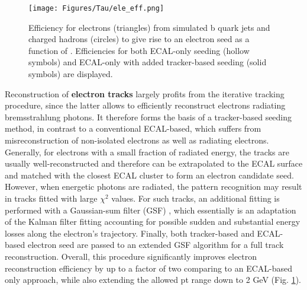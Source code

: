 

\begin{figure}[ht!]
    \centering
    \texttt{[image: Figures/Tau/ele\_eff.png]}
    \caption{Efficiency for electrons (triangles) from simulated b quark jets and charged hadrons (circles) to give rise to an electron seed as a function of \pt. Efficiencies for both ECAL-only seeding (hollow symbols) and ECAL-only with added tracker-based seeding (solid symbols) are displayed.}
    \label{fig:ele_eff}
\end{figure}

Reconstruction of \textbf{electron tracks} largely profits from the iterative tracking procedure, since the latter allows to efficiently reconstruct electrons radiating bremsstrahlung photons. It therefore forms the basis of a tracker-based seeding method, in contrast to a conventional ECAL-based, which suffers from misreconstruction of non-isolated electrons as well as radiating electrons. Generally, for electrons with a small fraction of radiated energy, the tracks are usually well-reconstructed and therefore can be extrapolated to the ECAL surface and matched with the closest ECAL cluster to form an electron candidate seed. However, when energetic photons are radiated, the pattern recognition may result in tracks fitted with large $\chi^2$ values. For such tracks, an additional fitting is performed with a Gaussian-sum filter (GSF) \cite{adam2005reconstruction}, which essentially is an adaptation of the Kalman filter fitting accounting for possible sudden and substantial energy losses along the electron's trajectory. Finally, both tracker-based and ECAL-based electron seed are passed to an extended GSF algorithm for a full track reconstruction. Overall, this procedure significantly improves electron reconstruction efficiency by up to a factor of two comparing to an ECAL-based only approach, while also extending the allowed pt range down to 2 GeV (Fig. \ref{fig:ele_eff}).

